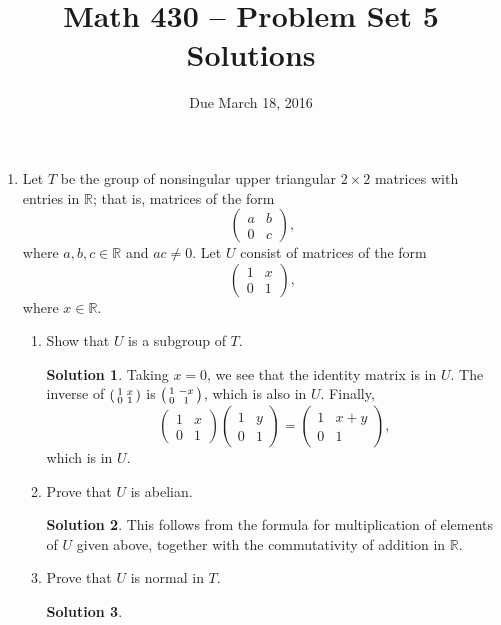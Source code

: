 \documentclass{article}
\title{Math 430 -- Problem Set 5 Solutions}
\date{Due March 18, 2016}
\newcommand{\RR}{\mathbb{R}}
\theoremstyle{definition}
\newtheorem*{solution}{Solution}
\begin{document}
\maketitle


\begin{enumerate}

\item[10.4.] Let $T$ be the group of nonsingular upper triangular $2 \times 2$ matrices with entries in $\RR$; that is, matrices of the form
\[
\begin{pmatrix} a & b \\ 0 & c \end{pmatrix},
\]
where $a, b, c \in \RR$ and $ac \ne 0$. Let $U$ consist of matrices of the form
\[
\begin{pmatrix} 1 & x \\ 0 & 1 \end{pmatrix},
\]
where $x \in \RR$.
\begin{enumerate}
\item Show that $U$ is a subgroup of $T$.
\begin{solution}
Taking $x = 0$, we see that the identity matrix is in $U$.  The inverse of $\begin{psmallmatrix} 1 & x \\ 0 & 1 \end{psmallmatrix}$ is $\begin{psmallmatrix} 1 & -x \\ 0 & 1 \end{psmallmatrix}$, which is also in $U$.  Finally,
\[
\begin{pmatrix} 1 & x \\ 0 & 1 \end{pmatrix} \begin{pmatrix} 1 & y \\ 0 & 1 \end{pmatrix} = \begin{pmatrix} 1 & x+y \\ 0 & 1 \end{pmatrix},
\]
which is in $U$.
\end{solution}
\item Prove that $U$ is abelian.
\begin{solution}
This follows from the formula for multiplication of elements of $U$ given above, together with the commutativity of addition in $\RR$.
\end{solution}
\item Prove that $U$ is normal in $T$.
\begin{solution}

\end{solution}
\end{enumerate}
\end{enumerate}
\end{document}

